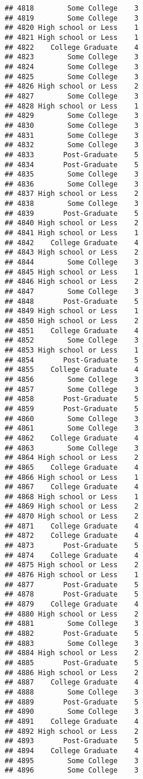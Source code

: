 \documentclass[
]{article}
\begin{document}
\begin{verbatim}
## 4818        Some College    3
## 4819        Some College    3
## 4820 High school or Less    1
## 4821 High school or Less    1
## 4822    College Graduate    4
## 4823        Some College    3
## 4824        Some College    3
## 4825        Some College    3
## 4826 High school or Less    2
## 4827        Some College    3
## 4828 High school or Less    1
## 4829        Some College    3
## 4830        Some College    3
## 4831        Some College    3
## 4832        Some College    3
## 4833       Post-Graduate    5
## 4834       Post-Graduate    5
## 4835        Some College    3
## 4836        Some College    3
## 4837 High school or Less    2
## 4838        Some College    3
## 4839       Post-Graduate    5
## 4840 High school or Less    2
## 4841 High school or Less    1
## 4842    College Graduate    4
## 4843 High school or Less    2
## 4844        Some College    3
## 4845 High school or Less    1
## 4846 High school or Less    2
## 4847        Some College    3
## 4848       Post-Graduate    5
## 4849 High school or Less    1
## 4850 High school or Less    2
## 4851    College Graduate    4
## 4852        Some College    3
## 4853 High school or Less    1
## 4854       Post-Graduate    5
## 4855    College Graduate    4
## 4856        Some College    3
## 4857        Some College    3
## 4858       Post-Graduate    5
## 4859       Post-Graduate    5
## 4860        Some College    3
## 4861        Some College    3
## 4862    College Graduate    4
## 4863        Some College    3
## 4864 High school or Less    2
## 4865    College Graduate    4
## 4866 High school or Less    1
## 4867    College Graduate    4
## 4868 High school or Less    1
## 4869 High school or Less    2
## 4870 High school or Less    2
## 4871    College Graduate    4
## 4872    College Graduate    4
## 4873       Post-Graduate    5
## 4874    College Graduate    4
## 4875 High school or Less    2
## 4876 High school or Less    1
## 4877       Post-Graduate    5
## 4878       Post-Graduate    5
## 4879    College Graduate    4
## 4880 High school or Less    2
## 4881        Some College    3
## 4882       Post-Graduate    5
## 4883        Some College    3
## 4884 High school or Less    2
## 4885       Post-Graduate    5
## 4886 High school or Less    2
## 4887    College Graduate    4
## 4888        Some College    3
## 4889       Post-Graduate    5
## 4890        Some College    3
## 4891    College Graduate    4
## 4892 High school or Less    2
## 4893       Post-Graduate    5
## 4894    College Graduate    4
## 4895        Some College    3
## 4896        Some College    3

\end{verbatim}
\end{document}
